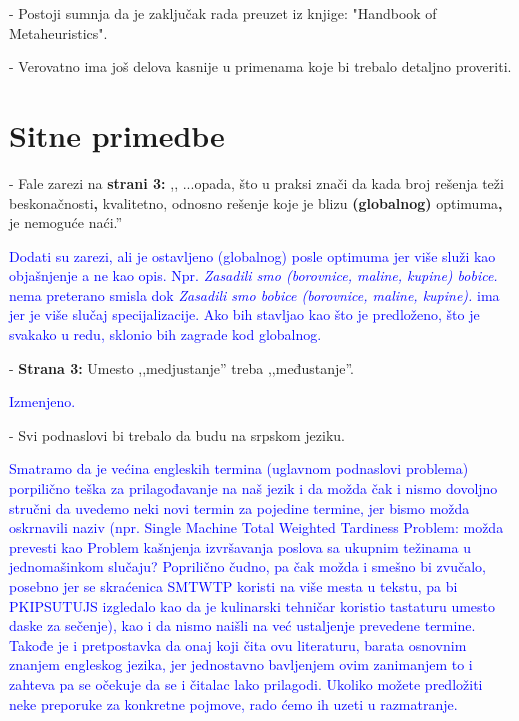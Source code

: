 \documentclass[a4paper]{report}
\newcommand{\odgovor}[1]{\textcolor{blue}{#1}}
\begin{document}
- Postoji sumnja da je zaključak rada preuzet iz knjige: "Handbook of Metaheuristics".

- Verovatno ima još delova kasnije u primenama koje bi trebalo detaljno proveriti.

\section{Sitne primedbe}
- Fale zarezi na \textbf{strani 3:} ,, ...opada, što u praksi znači da kada broj rešenja teži beskonačnosti\textbf{,} kvalitetno, odnosno rešenje koje
je blizu \textbf{(globalnog)} optimuma\textbf{,} je nemoguće naći.''

\odgovor{Dodati su zarezi, ali je ostavljeno (globalnog) posle optimuma jer više služi kao objašnjenje a ne kao opis. Npr. \textit{Zasadili smo (borovnice, maline, kupine) bobice.} nema preterano smisla dok 
\textit{Zasadili smo bobice (borovnice, maline, kupine).} ima jer je više slučaj specijalizacije. Ako bih stavljao kao što je predloženo, što je svakako u redu, sklonio bih zagrade kod globalnog.\\}

- \textbf{Strana 3:} Umesto ,,medjustanje'' treba ,,međustanje''.

\odgovor{Izmenjeno.\\}

- Svi podnaslovi bi trebalo da budu na srpskom jeziku.


\odgovor{Smatramo da je većina engleskih termina (uglavnom podnaslovi problema) porpilično teška za prilagođavanje na naš jezik i da možda čak i nismo dovoljno stručni da uvedemo neki novi termin za pojedine termine, jer bismo možda oskrnavili naziv (npr. Single Machine Total Weighted Tardiness Problem: možda prevesti kao Problem kašnjenja izvršavanja poslova sa ukupnim težinama u jednomašinkom slučaju? Poprilično čudno, pa čak možda i smešno bi zvučalo, posebno jer se skraćenica SMTWTP koristi na više mesta u tekstu, pa bi PKIPSUTUJS izgledalo kao da je kulinarski tehničar koristio tastaturu umesto daske za sečenje), kao i da nismo naišli na već ustaljenje prevedene termine. Takođe je i pretpostavka da onaj koji čita ovu literaturu, barata osnovnim znanjem engleskog jezika, jer jednostavno bavljenjem ovim zanimanjem to i zahteva pa se očekuje da se i čitalac lako prilagodi. Ukoliko možete predložiti neke preporuke za konkretne pojmove, rado ćemo ih uzeti u razmatranje.\\}
\end{document}
